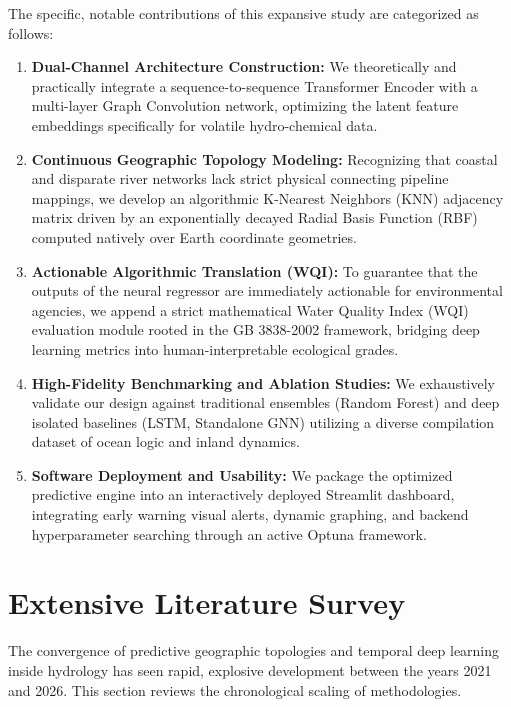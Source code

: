 \documentclass[journal,10pt,twocolumn]{IEEEtran}
\begin{document}
The specific, notable contributions of this expansive study are categorized as follows:
\begin{enumerate}
    \item \textbf{Dual-Channel Architecture Construction:} We theoretically and practically integrate a sequence-to-sequence Transformer Encoder with a multi-layer Graph Convolution network, optimizing the latent feature embeddings specifically for volatile hydro-chemical data.
    \item \textbf{Continuous Geographic Topology Modeling:} Recognizing that coastal and disparate river networks lack strict physical connecting pipeline mappings, we develop an algorithmic K-Nearest Neighbors (KNN) adjacency matrix driven by an exponentially decayed Radial Basis Function (RBF) computed natively over Earth coordinate geometries.
    \item \textbf{Actionable Algorithmic Translation (WQI):} To guarantee that the outputs of the neural regressor are immediately actionable for environmental agencies, we append a strict mathematical Water Quality Index (WQI) evaluation module rooted in the GB 3838-2002 framework, bridging deep learning metrics into human-interpretable ecological grades.
    \item \textbf{High-Fidelity Benchmarking and Ablation Studies:} We exhaustively validate our design against traditional ensembles (Random Forest) and deep isolated baselines (LSTM, Standalone GNN) utilizing a diverse compilation dataset of ocean logic and inland dynamics.
    \item \textbf{Software Deployment and Usability:} We package the optimized predictive engine into an interactively deployed Streamlit dashboard, integrating early warning visual alerts, dynamic graphing, and backend hyperparameter searching through an active Optuna framework.
\end{enumerate}

\section{Extensive Literature Survey}

The convergence of predictive geographic topologies and temporal deep learning inside hydrology has seen rapid, explosive development between the years 2021 and 2026. This section reviews the chronological scaling of methodologies.
\end{document}
